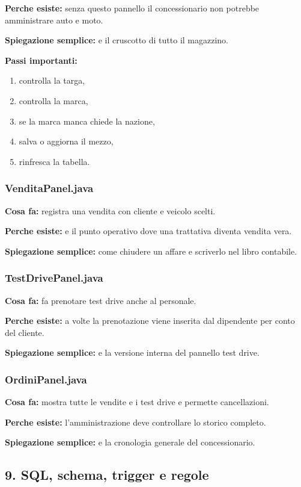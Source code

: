 \documentclass[12pt,a4paper]{article}
\begin{document}
\textbf{Perche esiste:} senza questo pannello il concessionario non potrebbe amministrare auto e moto.

\textbf{Spiegazione semplice:} e il cruscotto di tutto il magazzino.

\textbf{Passi importanti:}
\begin{enumerate}
  \item controlla la targa,
  \item controlla la marca,
  \item se la marca manca chiede la nazione,
  \item salva o aggiorna il mezzo,
  \item rinfresca la tabella.
\end{enumerate}

\subsubsection*{VenditaPanel.java}
\textbf{Cosa fa:} registra una vendita con cliente e veicolo scelti.

\textbf{Perche esiste:} e il punto operativo dove una trattativa diventa vendita vera.

\textbf{Spiegazione semplice:} come chiudere un affare e scriverlo nel libro contabile.

\subsubsection*{TestDrivePanel.java}
\textbf{Cosa fa:} fa prenotare test drive anche al personale.

\textbf{Perche esiste:} a volte la prenotazione viene inserita dal dipendente per conto del cliente.

\textbf{Spiegazione semplice:} e la versione interna del pannello test drive.

\subsubsection*{OrdiniPanel.java}
\textbf{Cosa fa:} mostra tutte le vendite e i test drive e permette cancellazioni.

\textbf{Perche esiste:} l'amministrazione deve controllare lo storico completo.

\textbf{Spiegazione semplice:} e la cronologia generale del concessionario.

\subsection{9. SQL, schema, trigger e regole}
\end{document}

